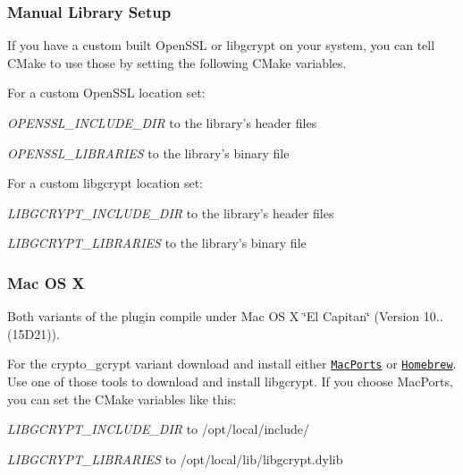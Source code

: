 \subsubsection*{Manual Library Setup}

If you have a custom built Open\+S\+S\+L or libgcrypt on your system, you can tell C\+Make to use those by setting the following C\+Make variables.

For a custom Open\+S\+S\+L location set\+:


\begin{DoxyItemize}
\item {\itshape O\+P\+E\+N\+S\+S\+L\+\_\+\+I\+N\+C\+L\+U\+D\+E\+\_\+\+D\+I\+R} to the library's header files
\item {\itshape O\+P\+E\+N\+S\+S\+L\+\_\+\+L\+I\+B\+R\+A\+R\+I\+E\+S} to the library's binary file
\end{DoxyItemize}

For a custom libgcrypt location set\+:


\begin{DoxyItemize}
\item {\itshape L\+I\+B\+G\+C\+R\+Y\+P\+T\+\_\+\+I\+N\+C\+L\+U\+D\+E\+\_\+\+D\+I\+R} to the library's header files
\item {\itshape L\+I\+B\+G\+C\+R\+Y\+P\+T\+\_\+\+L\+I\+B\+R\+A\+R\+I\+E\+S} to the library's binary file
\end{DoxyItemize}

\subsubsection*{Mac O\+S X}

Both variants of the plugin compile under Mac O\+S X \char`\"{}\+El Capitan\char`\"{} (Version 10.. (15\+D21)).

For the {\ttfamily crypto\+\_\+gcrypt} variant download and install either \href{https://www.macports.org/}{\tt Mac\+Ports} or \href{http://brew.sh/}{\tt Homebrew}. Use one of those tools to download and install {\ttfamily libgcrypt}. If you choose Mac\+Ports, you can set the C\+Make variables like this\+:


\begin{DoxyItemize}
\item {\itshape L\+I\+B\+G\+C\+R\+Y\+P\+T\+\_\+\+I\+N\+C\+L\+U\+D\+E\+\_\+\+D\+I\+R} to {\ttfamily /opt/local/include/}
\item {\itshape L\+I\+B\+G\+C\+R\+Y\+P\+T\+\_\+\+L\+I\+B\+R\+A\+R\+I\+E\+S} to {\ttfamily /opt/local/lib/libgcrypt.dylib}
\end{DoxyItemize}

